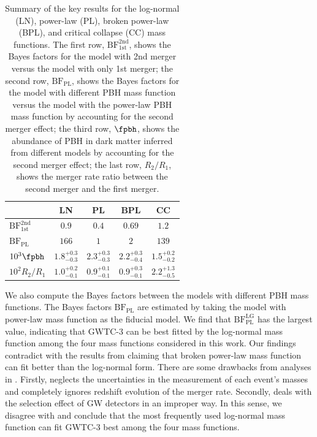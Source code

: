 \documentclass[twocolumn]{aastex631}
\begin{document}
\begin{table}[tbp!]
	\centering
	\begin{tabular}{l|c|c|c|c}
		\hline\hline
		& LN & PL & BPL & CC \\
		\hline
		$\mathrm{BF}^{\mathrm{2nd}}_{\mathrm{1st}}$ & $0.9$ & $0.4$ & $0.69$ & $1.2$ \\
		$\mathrm{BF}_{\mathrm{PL}}$ & $166$ & $1$ & $2$ & $139$ \\
		$10^{3}\fpbh$ & $1.8^{+0.3}_{-0.3}$ & $2.3^{+0.3}_{-0.3}$ & $2.2^{+0.3}_{-0.4}$ & $1.5^{+0.2}_{-0.2}$ \\
		$10^{2}R_2/R_1$ & $1.0^{+0.2}_{-0.1}$ & $0.9^{+0.1}_{-0.1}$ & $0.9^{+0.3}_{-0.1}$ & $2.2^{+1.3}_{-0.5}$ \\
		\hline
	\end{tabular}
	\caption{\label{table:BF} Summary of the key results for the log-normal (LN), power-law (PL), broken power-law (BPL), and critical collapse (CC) mass functions. The first row, $\mathrm{BF}^{\mathrm{2nd}}_{\mathrm{1st}}$, shows the Bayes factors for the model with 2nd merger versus the model with only 1st merger; the second row, $\mathrm{BF}_{\mathrm{PL}}$, shows the Bayes factors for the model with different PBH mass function versus the model with the power-law PBH mass function by accounting for the second merger effect; the third row, $\fpbh$, shows the abundance of PBH in dark matter inferred from different models by accounting for the second merger effect; the last row, $R_2/R_1$, shows the merger rate ratio between the second merger and the first merger.}
\end{table}

We also compute the Bayes factors between the models with different PBH mass functions. The Bayes factors $\mathrm{BF}_{\mathrm{PL}}$ are estimated by taking the model with power-law mass function as the fiducial model. 
We find that $\mathrm{BF}_{\mathrm{PL}}^{\mathrm{LG}}$ has the largest value, indicating that GWTC-3 can be best fitted by the log-normal mass function among the four mass functions considered in this work. Our findings contradict with the results from \cite{Deng:2021ezy} claiming that broken power-law mass function can fit better than the log-normal form. There are some drawbacks from analyses in \cite{Deng:2021ezy}. Firstly, \cite{Deng:2021ezy} neglects the uncertainties in the measurement of each event's masses and completely ignores redshift evolution of the merger rate. Secondly, \cite{Deng:2021ezy} deals with the selection effect of GW detectors in an improper way. In this sense, we disagree with \cite{Deng:2021ezy} and conclude that the most frequently used log-normal mass function can fit GWTC-3 best among the four mass functions.
\end{document}
